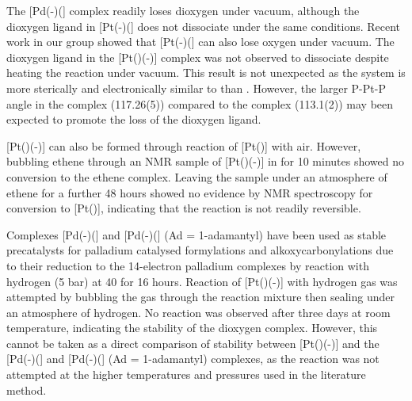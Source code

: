 The [Pd(-)(] complex readily loses dioxygen under vacuum, although the dioxygen ligand in [Pt(-)(] does not dissociate under the same conditions.\cite{Yoshida1979}  Recent work in our group showed that [Pt(-)(] can also lose oxygen under vacuum.\cite{Kathrynthesis, Rosieunpublished}  The dioxygen ligand in the [Pt(\tButhixantphos)(-)] complex was not observed to dissociate despite heating the reaction under vacuum.  This result is not unexpected as the \tButhixantphos{} system is more sterically and electronically similar to  than .  However, the larger P-Pt-P angle in the \tButhixantphos{} complex (117.26(5)\degrees) compared to the  complex (113.1(2)\degrees) may been expected to promote the loss of the dioxygen ligand.\cite{Yoshida1979}  

[Pt(\tButhixantphos)(-)] can also be formed through reaction of [Pt(\tButhixantphos)] with air.  However, bubbling ethene through an NMR sample of [Pt(\tButhixantphos)(-)] in  for 10 minutes showed no conversion to the ethene complex.  Leaving the sample under an atmosphere of ethene for a further 48 hours showed no evidence by NMR spectroscopy for conversion to [Pt(\tButhixantphos)], indicating that the reaction is not readily reversible.  

Complexes [Pd(-)(] and [Pd(-)(] (Ad = 1-adamantyl) have been used as stable precatalysts for palladium catalysed formylations and alkoxycarbonylations due to their reduction to the 14-electron palladium complexes by reaction with hydrogen (5 bar) at 40\degC{} for 16 hours.\cite{Sergeev2010}  Reaction of [Pt(\tButhixantphos)(-)] with hydrogen gas was attempted by bubbling the gas through the reaction mixture then sealing under an atmosphere of hydrogen.  No reaction was observed after three days at room temperature, indicating the stability of the dioxygen complex.  However, this cannot be taken as a direct comparison of stability between [Pt(\tButhixantphos)(-)] and the [Pd(-)(] and [Pd(-)(] (Ad = 1-adamantyl) complexes, as the reaction was not attempted at the higher temperatures and pressures used in the literature method.\cite{Sergeev2010}

